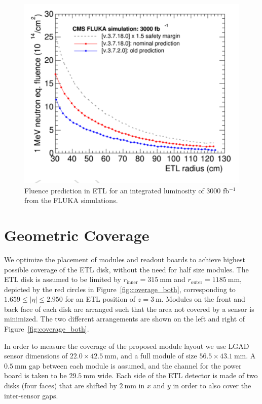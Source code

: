 \documentclass[11pt]{article}
\begin{document}
\begin{figure}[!ht]
\centering
\includegraphics[width=\linewidth]{figures/image6.pdf}
\caption{
Fluence prediction in ETL for an integrated luminosity of 3000 fb$^{-1}$ from the FLUKA simulations.}
\label{fig:fluka}
\end{figure}

\section{Geometric Coverage}

We optimize the placement of modules and readout boards to achieve highest possible coverage of the ETL disk, without the need for half size modules.
The ETL disk is assumed to be limited by $r_{\mathrm{inner}}=315~\mathrm{mm}$ and $r_{\mathrm{outer}}=1185~\mathrm{mm}$, depicted by the red circles in Figure~\ref{fig:coverage_both}, corresponding to $1.659 \leq |\eta| \leq 2.950$ for an ETL position of $z=3~\mathrm{m}$.
Modules on the front and back face of each disk are arranged such that the area not covered by a sensor is minimized.
The two different arrangements are shown on the left and right of Figure~\ref{fig:coverage_both}.

In order to measure the coverage of the proposed module layout we use LGAD sensor dimensions of $22.0 \times 42.5~\mathrm{mm}$, and a full module of size $56.5 \times 43.1~\mathrm{mm}$.
A $0.5~\mathrm{mm}$ gap between each module is assumed, and the channel for the power board is taken to be $29.5~\mathrm{mm}$ wide.
Each side of the ETL detector is made of two disks (four faces) that are shifted by $2~\mathrm{mm}$ in $x$ and $y$ in order to also cover the inter-sensor gaps.
\end{document}

